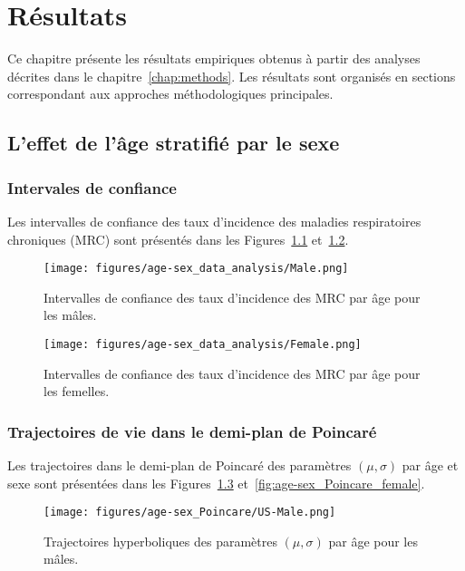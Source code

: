 \chapter{Résultats}
\label{chap:results}

Ce chapitre présente les résultats empiriques obtenus à partir des analyses décrites dans le chapitre~\ref{chap:methods}. Les résultats sont organisés en sections correspondant aux approches méthodologiques principales.

\section{L'effet de l'âge stratifié par le sexe}

\subsection{Intervales de confiance}

Les intervalles de confiance des taux d'incidence des maladies respiratoires chroniques (MRC) sont présentés dans les Figures~\ref{fig:CI-age-sex-males} et~\ref{fig:CI-age-sex-females}.

\begin{figure}[H]
	\centering
	\texttt{[image: figures/age-sex\_data\_analysis/Male.png]}
	\caption{Intervalles de confiance des taux d'incidence des MRC par âge pour les mâles.}
	\label{fig:CI-age-sex-males}
\end{figure}

\begin{figure}[H]
	\centering
	\texttt{[image: figures/age-sex\_data\_analysis/Female.png]}
	\caption{Intervalles de confiance des taux d'incidence des MRC par âge pour les femelles.}
	\label{fig:CI-age-sex-females}
\end{figure}

\subsection{Trajectoires de vie dans le demi-plan de Poincaré}

Les trajectoires dans le demi-plan de Poincaré des paramètres \((\mu, \sigma)\) par âge et sexe sont présentées dans les Figures~\ref{fig:age-sex_Poincare_male} et~\ref{fig:age-sex_Poincare_female}.

\begin{figure}[H]
	\centering
	\texttt{[image: figures/age-sex\_Poincare/US-Male.png]}
	\caption{Trajectoires hyperboliques des paramètres \((\mu, \sigma)\) par âge pour les mâles.}
	\label{fig:age-sex_Poincare_male}
\end{figure}

